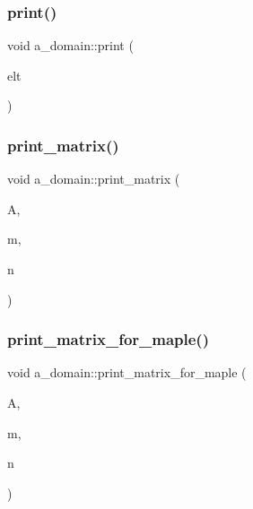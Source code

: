 \mbox{\label{classa__domain_a1de338fa6c9325e4412338769aeab8f5}} 
\subsubsection{\texorpdfstring{print()}{print()}}
{\footnotesize\ttfamily void a\+\_\+domain\+::print (\begin{DoxyParamCaption}\item[{\mbox{\hyperlink{galois_8h_a09fddde158a3a20bd2dcadb609de11dc}{I\+NT}} $\ast$}]{elt }\end{DoxyParamCaption})}

\mbox{\label{classa__domain_a5d2acb9c01e71e0e925e954b17861d19}} 
\subsubsection{\texorpdfstring{print\+\_\+matrix()}{print\_matrix()}}
{\footnotesize\ttfamily void a\+\_\+domain\+::print\+\_\+matrix (\begin{DoxyParamCaption}\item[{\mbox{\hyperlink{galois_8h_a09fddde158a3a20bd2dcadb609de11dc}{I\+NT}} $\ast$}]{A,  }\item[{\mbox{\hyperlink{galois_8h_a09fddde158a3a20bd2dcadb609de11dc}{I\+NT}}}]{m,  }\item[{\mbox{\hyperlink{galois_8h_a09fddde158a3a20bd2dcadb609de11dc}{I\+NT}}}]{n }\end{DoxyParamCaption})}

\mbox{\label{classa__domain_ab50802b5b64e348d1e9c15e25052052c}} 
\subsubsection{\texorpdfstring{print\+\_\+matrix\+\_\+for\+\_\+maple()}{print\_matrix\_for\_maple()}}
{\footnotesize\ttfamily void a\+\_\+domain\+::print\+\_\+matrix\+\_\+for\+\_\+maple (\begin{DoxyParamCaption}\item[{\mbox{\hyperlink{galois_8h_a09fddde158a3a20bd2dcadb609de11dc}{I\+NT}} $\ast$}]{A,  }\item[{\mbox{\hyperlink{galois_8h_a09fddde158a3a20bd2dcadb609de11dc}{I\+NT}}}]{m,  }\item[{\mbox{\hyperlink{galois_8h_a09fddde158a3a20bd2dcadb609de11dc}{I\+NT}}}]{n }\end{DoxyParamCaption})}

